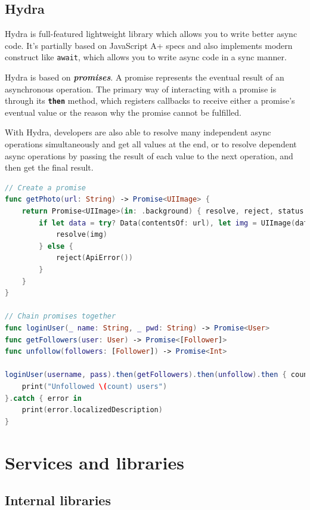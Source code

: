 \documentclass[a4paper, 11pt, parskip=half]{scrreprt}
\theoremstyle{definition}
\begin{document}
\section{Hydra}

Hydra is full-featured lightweight library which allows you to write better async code. It's partially based on JavaScript A+ specs and also implements modern construct like \texttt{await}, which allows you to write async code in a sync manner.

Hydra is based on \textbf{\textit{promises}}. A promise represents the eventual result of an asynchronous operation. The primary way of interacting with a promise is through its \textbf{\texttt{then}} method, which registers callbacks to receive either a promise’s eventual value or the reason why the promise cannot be fulfilled.

With Hydra, developers are also able to resolve many independent async operations simultaneously and get all values at the end, or to resolve dependent async operations by passing the result of each value to the next operation, and then get the final result.

\newpage
\begin{lstlisting}[language=swift, caption=Hydra examples.]
// Create a promise
func getPhoto(url: String) -> Promise<UIImage> {
    return Promise<UIImage>(in: .background) { resolve, reject, status in
        if let data = try? Data(contentsOf: url), let img = UIImage(data: data) {
            resolve(img)
        } else {
            reject(ApiError())
        }
    }
}

// Chain promises together
func loginUser(_ name: String, _ pwd: String) -> Promise<User>
func getFollowers(user: User) -> Promise<[Follower]>
func unfollow(followers: [Follower]) -> Promise<Int>

loginUser(username, pass).then(getFollowers).then(unfollow).then { count in
    print("Unfollowed \(count) users")
}.catch { error in
    print(error.localizedDescription)
}
\end{lstlisting}







\chapter{Services and libraries}

\section{Internal libraries}
\end{document}
